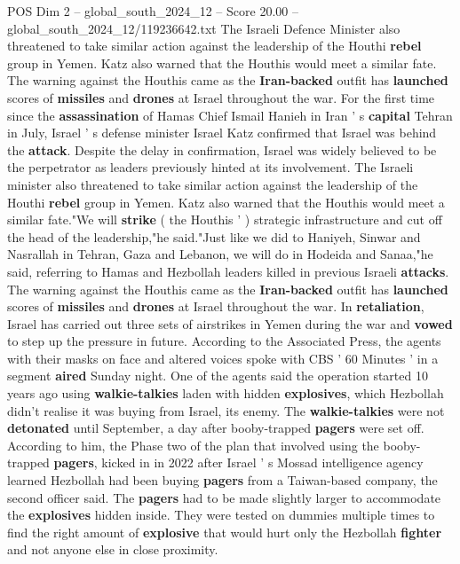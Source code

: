 \begin{textsample}{POS Dim 2 – global\_south\_2024\_12 – Score 20.00 – global\_south\_2024\_12/119236642.txt}  \label{ex:f2_pos_207}
The Israeli Defence Minister also threatened to take similar action against the leadership of the Houthi \textbf{rebel} group in Yemen.
Katz also warned that the Houthis would meet a similar fate.
The warning against the Houthis came as the \textbf{Iran-backed} outfit has \textbf{launched} scores of \textbf{missiles} and \textbf{drones} at Israel throughout the war.
For the first time since the \textbf{assassination} of Hamas Chief Ismail Hanieh in Iran ' s \textbf{capital} Tehran in July, Israel ' s defense minister Israel Katz confirmed that Israel was behind the \textbf{attack}.
Despite the delay in confirmation, Israel was widely believed to be the perpetrator as leaders previously hinted at its involvement.
The Israeli minister also threatened to take similar action against the leadership of the Houthi \textbf{rebel} group in Yemen.
Katz also warned that the Houthis would meet a similar fate."We will \textbf{strike} ( the Houthis ' ) strategic infrastructure and cut off the head of the leadership,"he said."Just like we did to Haniyeh, Sinwar and Nasrallah in Tehran, Gaza and Lebanon, we will do in Hodeida and Sanaa,"he said, referring to Hamas and Hezbollah leaders killed in previous Israeli \textbf{attacks}.
The warning against the Houthis came as the \textbf{Iran-backed} outfit has \textbf{launched} scores of \textbf{missiles} and \textbf{drones} at Israel throughout the war.
In \textbf{retaliation}, Israel has carried out three sets of airstrikes in Yemen during the war and \textbf{vowed} to step up the pressure in future.
According to the Associated Press, the agents with their masks on face and altered voices spoke with CBS ' 60 Minutes ' in a segment \textbf{aired} Sunday night.
One of the agents said the operation started 10 years ago using \textbf{walkie-talkies} laden with hidden \textbf{explosives}, which Hezbollah didn't realise it was buying from Israel, its enemy.
The \textbf{walkie-talkies} were not \textbf{detonated} until September, a day after booby-trapped \textbf{pagers} were set off.
According to him, the Phase two of the plan that involved using the booby-trapped \textbf{pagers}, kicked in in 2022 after Israel ' s Mossad intelligence agency learned Hezbollah had been buying \textbf{pagers} from a Taiwan-based company, the second officer said.
The \textbf{pagers} had to be made slightly larger to accommodate the \textbf{explosives} hidden inside.
They were tested on dummies multiple times to find the right amount of \textbf{explosive} that would hurt only the Hezbollah \textbf{fighter} and not anyone else in close proximity.

\end{textsample}
